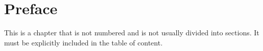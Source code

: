 \chapter*{Preface}
\label{sec:intro}
This is a chapter that is not numbered and is not usually divided into sections. It must be explicitly included in the table of content.

\lipsum[1-5]